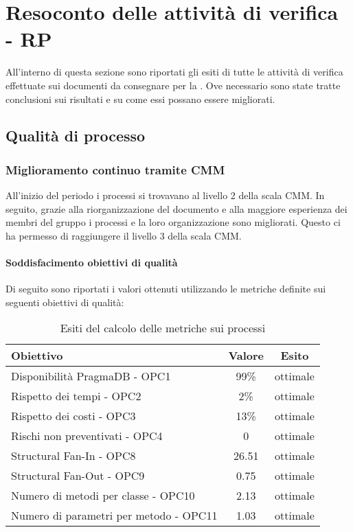 \documentclass[PdQ.tex]{subfiles}
\begin{document}
\section{Resoconto delle attività di verifica - RP}
All'interno di questa sezione sono riportati gli esiti di tutte le attività di verifica effettuate sui documenti da consegnare per la \RP{}. Ove necessario sono state tratte conclusioni sui risultati e su come essi possano essere migliorati.

\subsection{Qualità di processo}
		\subsubsection{Miglioramento continuo tramite CMM}
	
		All'inizio del periodo i processi si trovavano al livello 2 della scala CMM. In seguito, grazie alla riorganizzazione del documento \NPdocRP{} e alla maggiore esperienza dei membri del gruppo i processi e la loro organizzazione sono migliorati. Questo ci ha permesso di raggiungere il livello 3 della scala CMM. 

		\paragraph{Soddisfacimento obiettivi di qualità}
			Di seguito sono riportati i valori ottenuti utilizzando le metriche definite sui seguenti obiettivi di qualità:
			\begin{table}[h]
				\centering
				\begin{tabular}{l c c}
					\hline
					\rule[-0.3cm]{0cm}{0.8cm}
					\textbf{Obiettivo} & \textbf{Valore} & \textbf{Esito} \\
					\hline
					\rule[0cm]{0cm}{0.4cm}
					Disponibilità PragmaDB - OPC1 & 99\% & ottimale \\
					\rule[0cm]{0cm}{0.4cm}
					Rispetto dei tempi - OPC2 & 2\% & ottimale \\
					\rule[0cm]{0cm}{0.4cm}
					Rispetto dei costi - OPC3 & 13\% & ottimale\\ 
					\rule[0cm]{0cm}{0.4cm}
					Rischi non preventivati - OPC4 & 0 & ottimale\\ 
					\rule[0cm]{0cm}{0.4cm}
					Structural Fan-In - OPC8 & 26.51 & ottimale\\ 
					\rule[0cm]{0cm}{0.4cm}
					Structural Fan-Out - OPC9 & 0.75 & ottimale\\ 
					\rule[0cm]{0cm}{0.4cm}
					Numero di metodi per classe - OPC10 & 2.13 & ottimale\\ 
					\rule[0cm]{0cm}{0.4cm}
					Numero di parametri per metodo - OPC11 & 1.03 & ottimale\\ 
					\hline
				\end{tabular}
				\caption{Esiti del calcolo delle metriche sui processi}
			\end{table}
		
\end{document}
